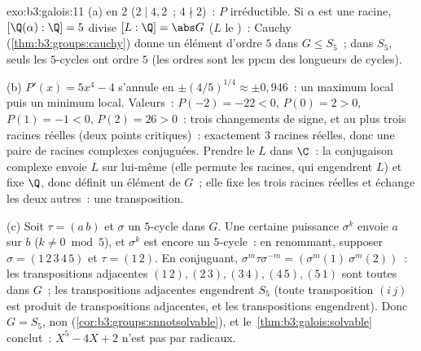 \begin{solution}{exo:b3:galois:11}
(a)  en $2$ ($2 \mid 4, 2$~; $4 \nmid 2$)~: $P$
irréductible. Si $\alpha$ est une racine, $[\Q(\alpha):\Q] = 5$
divise $[L:\Q] = \abs G$ ($L$ le )~:
Cauchy (\cref{thm:b3:groups:cauchy}) donne un élément d'ordre
$5$ dans $G \leq S_5$~; dans $S_5$, seuls les $5$-cycles ont
ordre $5$ (les ordres sont les ppcm des longueurs de cycles).

(b) $P'(x) = 5x^4 - 4$ s'annule en $\pm(4/5)^{1/4} \approx \pm
0{,}946$~: un maximum local puis un minimum local. Valeurs~:
$P(-2) = -22 < 0$, $P(0) = 2 > 0$, $P(1) = -1 < 0$, $P(2) =
26 > 0$~: trois changements de signe, et au plus trois racines
réelles (deux points critiques)~: exactement $3$ racines
réelles, donc une paire de racines complexes conjuguées.
Prendre le  $L$ dans $\C$~: la
conjugaison complexe envoie $L$ sur lui-même (elle permute les
racines, qui engendrent $L$) et fixe $\Q$, donc définit un
élément de $G$~; elle fixe les trois racines réelles et
échange les deux autres~: une transposition.

(c) Soit $\tau = (a\,b)$ et $\sigma$ un $5$-cycle dans $G$. Une
certaine puissance $\sigma^k$ envoie $a$ sur $b$ ($k \ne 0
\bmod 5$), et $\sigma^k$ est encore un $5$-cycle~: en
renommant, supposer $\sigma = (1\,2\,3\,4\,5)$ et $\tau =
(1\,2)$. En conjuguant, $\sigma^m\tau\sigma^{-m} =
(\sigma^m(1)\ \sigma^m(2))$~: les transpositions adjacentes
$(1\,2), (2\,3), (3\,4), (4\,5), (5\,1)$ sont toutes dans $G$~;
les transpositions adjacentes engendrent $S_5$ (toute
transposition $(i\,j)$ est produit de transpositions
adjacentes, et les transpositions engendrent). Donc $G =
S_5$, non  (\cref{cor:b3:groups:snnotsolvable}), et
le~\cref{thm:b3:galois:solvable} conclut~: $X^5 - 4X + 2$ n'est
pas  par radicaux.
\end{solution}

